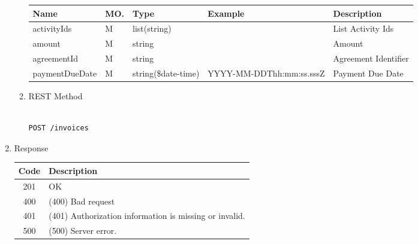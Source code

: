 \begin{enumerate}
\begin{enumerate}
\begin{table}[H]
\begin{center}
\begin{tabular}{|p{3cm}|l|p{3cm}|p{3cm}|p{4cm}|} 
\hline
\rowcolor{lightgray}	Name	& MO.	& Type	& Example & 	Description \\
\hline

activityIds				& M	& 	list(string)		&								&	List Activity Ids \\ 
\hline

amount					& M	& 	string				&								&	Amount  \\ 
\hline

agreementId				& M & 	string				&								&	Agreement Identifier \\
\hline

paymentDueDate			& M &	string(\$date-time)	&	YYYY-MM-DDThh:mm:ss.sssZ	&	Payment Due Date \\
\hline

\end{tabular}
\end{center}
\end{table}


\item REST Method

\begin{tcolorbox}[boxrule=0pt, frame empty]
\begin{verbatim} 

POST /invoices

\end{verbatim}
\end{tcolorbox}

\end{enumerate}

\item Response

\begin{table}[H]
\footnotesize

\begin{center}
\begin{tabular}{|c|l|} 
\hline
\rowcolor{lightgray}	Code 		& 	Description \\
\hline
201	 		&	OK \\
\hline
400			&	(400) Bad request \\
\hline
401			&	(401) Authorization information is missing or invalid. \\
\hline
500			&	(500) Server error. \\
\hline
\end{tabular}
\end{center}


\end{table}
\end{enumerate}
